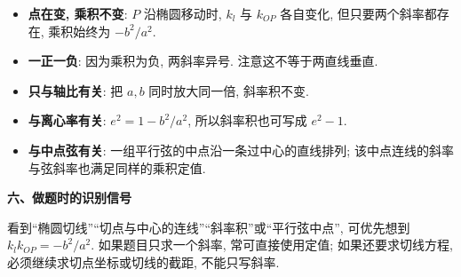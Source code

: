 \begin{explanationbox}
\begin{itemize}
  \item \textbf{点在变, 乘积不变}: $P$ 沿椭圆移动时, $k_l$ 与 $k_{OP}$ 各自变化,
  但只要两个斜率都存在, 乘积始终为 $-b^2/a^2$.
  \item \textbf{一正一负}: 因为乘积为负, 两斜率异号. 注意这不等于两直线垂直.
  \item \textbf{只与轴比有关}: 把 $a,b$ 同时放大同一倍, 斜率积不变.
  \item \textbf{与离心率有关}: $e^2=1-b^2/a^2$, 所以斜率积也可写成 $e^2-1$.
  \item \textbf{与中点弦有关}: 一组平行弦的中点沿一条过中心的直线排列;
  该中点连线的斜率与弦斜率也满足同样的乘积定值.
\end{itemize}

\textbf{六、做题时的识别信号}

看到“椭圆切线”“切点与中心的连线”“斜率积”或“平行弦中点”,
可优先想到 $k_lk_{OP}=-b^2/a^2$.
如果题目只求一个斜率, 常可直接使用定值;
如果还要求切线方程, 必须继续求切点坐标或切线的截距, 不能只写斜率.
\end{explanationbox}
